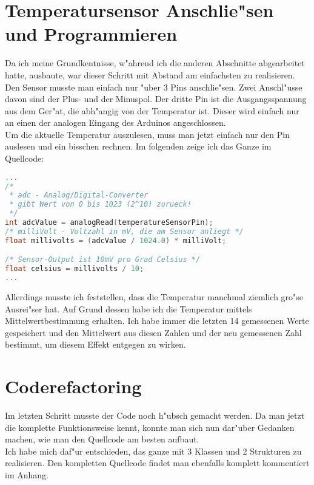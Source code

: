 \documentclass[a4paper]{scrreprt}
\begin{document}
		\section{Temperatursensor Anschlie"sen und Programmieren}
			Da ich meine Grundkentnisse, w"ahrend ich die anderen Abschnitte abgearbeitet hatte,
			ausbaute, war dieser Schritt mit Abstand am einfachsten zu realisieren.
			Den Sensor musste man einfach nur "uber 3 Pins anschlie"sen. Zwei Anschl"usse 
			davon sind der Plus- und der Minuspol.
			Der dritte Pin ist die Ausgangsspannung aus dem Ger"at, die abh"angig von der 
			Temperatur ist. Dieser wird einfach nur an einen der analogen Eingang des 
			Arduinos angeschlossen. \\
			Um die aktuelle Temperatur auszulesen, muss man jetzt einfach nur den Pin auslesen
			und ein bisschen rechnen. Im folgenden zeige ich das Ganze im Quellcode:
			\begin{lstlisting}[language=c++]
...
/* 
 * adc - Analog/Digital-Converter 
 * gibt Wert von 0 bis 1023 (2^10) zurueck!
 */
int adcValue = analogRead(temperatureSensorPin);
/* milliVolt - Voltzahl in mV, die am Sensor anliegt */
float millivolts = (adcValue / 1024.0) * milliVolt;

/* Sensor-Output ist 10mV pro Grad Celsius */
float celsius = millivolts / 10; 
...
			\end{lstlisting}
			Allerdings musste ich feststellen, dass die Temperatur manchmal ziemlich 
			gro"se Ausrei"ser hat.
			Auf Grund dessen habe ich die Temperatur mittels Mittelwertbestimmung erhalten.
			Ich habe immer die letzten 14 gemessenen Werte gespeichert und den Mittelwert aus
			diesen Zahlen und der neu gemessenen Zahl bestimmt, um diesem Effekt entgegen 
			zu wirken. 
		
		\section{Coderefactoring}		
		Im letzten Schritt musste der Code noch h"ubsch gemacht werden. Da man jetzt die
		komplette Funktionsweise kennt, konnte man sich nun dar"uber Gedanken machen, wie man
		den Quellcode am besten aufbaut. \\
		Ich habe mich daf"ur entschieden, das ganze mit 3 Klassen und 2 Strukturen zu realisieren.
		Den kompletten Quellcode findet man ebenfalls komplett kommentiert im Anhang.		
		
		
\end{document}
